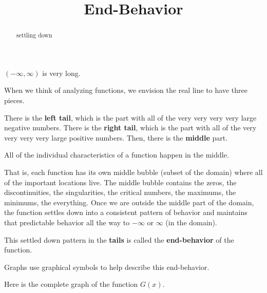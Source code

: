 \documentclass{ximera}
\title{End-Behavior}
\begin{document}
\begin{abstract}
settling down
\end{abstract}
\maketitle


$(-\infty, \infty)$ is very long. 


When we think of analyzing functions, we envision the real line to have three pieces. 





There is the \textbf{\textcolor{red!70!black}{left tail}}, which is the part with all of the very very very very large negative numbers. There is the \textbf{\textcolor{red!70!black}{right tail}}, which is the part with all of the very very very very large positive numbers. Then, there is the \textbf{\textcolor{purple!85!blue}{middle}} part. 

All of the individual characteristics of a function happen in the middle. 

That is, each function has its own middle bubble (subset of the domain) where all of the important locations live.  The middle bubble contains the zeros, the discontinuities, the singularities, the critical numbers, the maximums, the minimums, the everything.  Once we are outside the middle part of the domain, the function settles down into a consistent pattern of behavior and maintains that predictable behavior all the way to $-\infty$ or $\infty$ (in the domain). 

This settled down pattern in the \textbf{\textcolor{red!70!black}{tails}} is called the \textbf{\textcolor{red!70!black}{end-behavior}} of the function. 


Graphs use graphical symbols to help describe this end-behavior.


Here is the complete graph of the function $G(x)$. 
\end{document}
